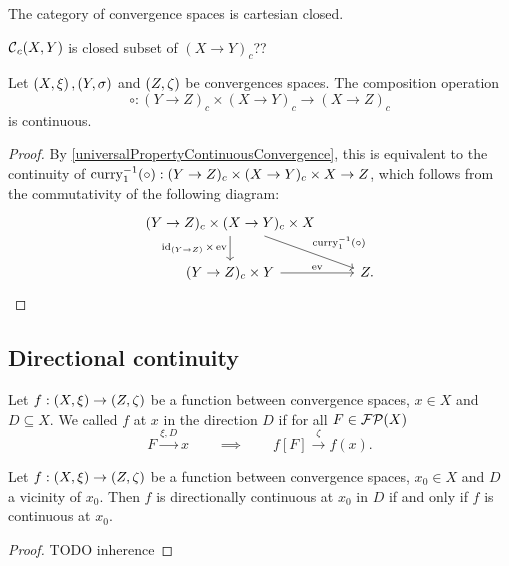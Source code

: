 \begin{corollary}
The category of convergence spaces is cartesian closed.
\end{corollary}

\begin{proposition}
$\operatorname{\mathcal{C}}_c(X,Y)$ is closed subset of $(X\to Y)_c$??
\end{proposition}

\begin{proposition}
Let $\left( X, \xi \right), \left( Y,\sigma \right)$ and $\left( Z,\zeta \right)$ be convergences spaces. The composition operation
\[ \circ: (Y\to Z)_c \times (X\to Y)_c \to (X\to Z)_c \]
is continuous.
\end{proposition}
\begin{proof}
By \ref{universalPropertyContinuousConvergence}, this is equivalent to the continuity of $\operatorname{curry}_1^{-1}(\circ): (Y\to Z)_c \times (X\to Y)_c \times X \to Z$, which follows from the commutativity of the following diagram:
\[\begin{tikzcd}
(Y\to Z)_c \times (X\to Y)_c \times X \ar[d, swap, "\id_{(Y\to Z)}\times \evalMap"] \ar[dr, "\curry_1^{-1}(\circ)"] & \\
(Y\to Z)_c\times Y \ar[r, "\evalMap"] & Z.
\end{tikzcd} \]
\end{proof}

\subsection{Directional continuity}
\begin{definition}
Let $f: \left( X,\xi \right) \to \left( Z,\zeta \right)$ be a function between convergence spaces, $x\in X$ and $D\subseteq X$. We called $f$  at $x$ in the direction $D$ if for all $F\in\operatorname{\mathcal{FP}}(X)$
\[ F \overset{\xi,D}{\longrightarrow} x \qquad \implies \qquad f[F] \overset{\zeta}{\longrightarrow} f(x). \]
\end{definition}

\begin{lemma}
Let $f: \left( X,\xi \right) \to \left( Z,\zeta \right)$ be a function between convergence spaces, $x_0\in X$ and $D$ a vicinity of $x_0$. Then $f$ is directionally continuous at $x_0$ in $D$ \textup{if and only if} $f$ is continuous at $x_0$.
\end{lemma}
\begin{proof}
TODO inherence
\end{proof}

